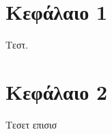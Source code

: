 \noindent
\section{Κεφάλαιο 1}
\label{sec:org11a830b}

Τεστ.
\section{Κεφάλαιο 2}
\label{sec:orgb5186f1}

Τεσετ επισισ
